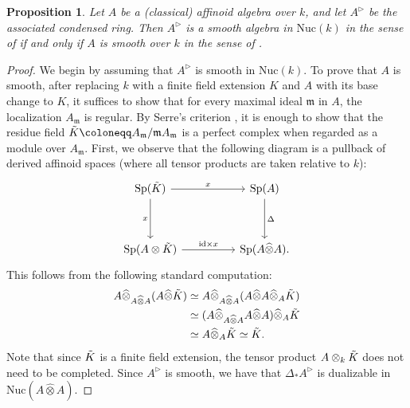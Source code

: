 \documentclass[oneside, hidelinks, 12pt, a4paper,reqno]{amsart}
\theoremstyle{plain}
\theoremstyle{definition}
\theoremstyle{plain}
\newtheorem{proposition}[proposition]{Proposition}
\newcommand{\Sp}{\mathrm{Sp}}
\newcommand{\Nuc}{\mathrm{Nuc}}
\begin{document}
\begin{proposition}\label{prop: non commutative smoothness affine case}
    Let $A$ be a (classical) affinoid algebra over $k$, and let $A^{\triangleright}$ be the associated condensed ring. Then $A^{\triangleright}$ is a smooth algebra in $\Nuc(k)$ in the sense of  if and only if $A$ is smooth over $k$ in the sense of .
\end{proposition}
\begin{proof}
    We begin by assuming that $A^\triangleright$ is smooth in $\Nuc(k)$. To prove that $A$ is smooth, after replacing $k$ with a finite field extension $K$ and $A$ with its base change to $K$, it suffices to show that for every maximal ideal $\mathfrak{m}$ in $A$, the localization $A_{\mathfrak{m}}$ is regular. By Serre's criterion \cite[Lemma 11.3.3.3]{SAG}, it is enough to show that the residue field $\Tilde{K}\coloneqq A_{\mathfrak{m}}/\mathfrak{m}A_{\mathfrak{m}}$ is a perfect complex when regarded as a module over $A_{\mathfrak{m}}$. First, we observe that the following diagram is a pullback of derived affinoid spaces (where all tensor products are taken relative to $k$): 
    \begin{equation}\label{eq: pullback affinoid spaces}
    \begin{tikzcd}
        {\Sp(\Tilde{K})} && {\Sp(A)} \\
        \\
        {\Sp(A\otimes \Tilde{K})} && {\Sp(A\widehat\otimes A).}
        \arrow["x", from=1-1, to=1-3]
        \arrow["x"', from=1-1, to=3-1]
        \arrow["\Delta", from=1-3, to=3-3]
        \arrow["\mathrm{id}\times x", from=3-1, to=3-3]
    \end{tikzcd}
    \end{equation}
    This follows from the following standard computation: 
    \begin{align*}
        A \widehat{\otimes}_{A\widehat{\otimes}A}(A\widehat{\otimes}\Tilde{K}) & \simeq A \widehat{\otimes}_{A\widehat{\otimes}A}(A\widehat{\otimes}A\widehat{\otimes}_{A}\Tilde{K}) \\ & \simeq 
        (A\widehat{\otimes}_{A\widehat{\otimes}A}A\widehat{\otimes}A)\widehat{\otimes}_A \Tilde{K} \\ &
        \simeq A\widehat{\otimes}_A \Tilde{K} \simeq \Tilde{K}.
    \end{align*}
    Note that since $\Tilde{K}$ is a finite field extension, the tensor product $A\otimes_{k}\Tilde{K}$ does not need to be completed. Since $A^{\triangleright}$ is smooth, we have that $\Delta_\ast A^{\triangleright}$ is dualizable in $\Nuc(A\widehat\otimes A)$.
    

\end{proof}
\end{document}
